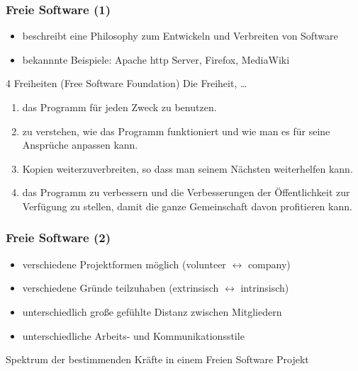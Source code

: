 \documentclass{beamer}
\begin{document}
\begin{frame}
\frametitle{Freie Software (1)}
\begin{itemize}
 \item beschreibt eine Philosophy zum Entwickeln und Verbreiten von Software
 \item bekannnte Beispiele: Apache http Server, Firefox, MediaWiki
\end{itemize}

\begin{block}{4 Freiheiten (Free Software Foundation)}
    Die Freiheit, \dots
    \begin{enumerate}
      \item das Programm für jeden Zweck zu benutzen.
      \item zu verstehen, wie das Programm funktioniert und wie man es für seine Ansprüche anpassen kann.
      \item Kopien weiterzuverbreiten, so dass man seinem Nächsten weiterhelfen kann.
      \item das Programm zu verbessern und die Verbesserungen der Öffentlichkeit zur Verfügung zu stellen, damit die ganze Gemeinschaft davon profitieren kann.
    \end{enumerate}
\end{block}
\end{frame}

\begin{frame}
\frametitle{Freie Software (2)}
\begin{itemize}
 \item verschiedene Projektformen m\"oglich (volunteer $\leftrightarrow$ company)
 \item verschiedene Gr\"unde teilzuhaben (extrinsisch $\leftrightarrow$ intrinsisch)
 \item unterschiedlich gro\ss e gef\"uhlte Distanz zwischen Mitgliedern
 \item unterschiedliche Arbeits- und Kommunikationsstile
\end{itemize}

\begin{block}{Spektrum der bestimmenden Kr\"afte in einem Freien Software Projekt}
\begin{figure}[h]
	\centering
\end{figure}
\end{block}
\end{frame}
\end{document}
